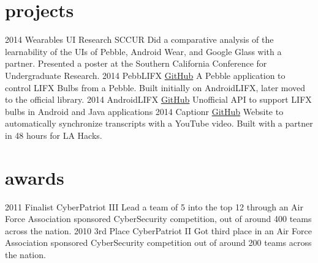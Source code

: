 \documentclass[]{akers-cv}
\begin{document}
\section{projects}

\begin{entrylist}
  \entry
    {2014}
    {Wearables UI Research}
    {SCCUR}
    {Did a comparative analysis of the learnability of the UIs of Pebble, Android Wear, and Google Glass with a partner. Presented a poster at the Southern California Conference for Undergraduate Research.}
  \entry
    {2014}
    {PebbLIFX}
    {\href{https://github.com/jadengore/PebbLIFX}{GitHub}}
    {A Pebble application to control LIFX Bulbs from a Pebble. Built initially on AndroidLIFX, later moved to the official library.}
  \entry
    {2014}
    {AndroidLIFX}
    {\href{https://github.com/akrs/AndroidLIFX}{GitHub}}
    {Unofficial API to support LIFX bulbs in Android and Java applications}
  \entry
    {2014}
    {Captionr}
    {\href{http://https://github.com/alexschneider/Captionr}{GitHub}}
    {Website to automatically synchronize transcripts with a YouTube video. Built with a partner in 48 hours for LA Hacks.}
\end{entrylist}

\section{awards}

\begin{entrylist}
  \entry
    {2011}
    {Finalist}
    {CyberPatriot III}
    {Lead a team of 5 into the top 12 through an Air Force Association sponsored CyberSecurity competition, out of around 400 teams across the nation.}
  \entry
    {2010}
    {3rd Place}
    {CyberPatriot II}
    {Got third place in an Air Force Association sponsored CyberSecurity competition out of around 200 teams across the nation.}
 \end{entrylist}
\end{document}
